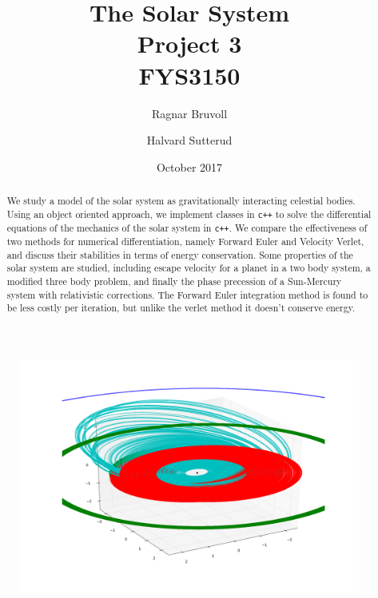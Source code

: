 \documentclass[10pt]{article}
\begin{document}
\title{The Solar System
\\ Project 3
\\ FYS3150}
\author{Ragnar Bruvoll \and Halvard Sutterud}
\date{October 2017}
\maketitle{\begin{center}\end{center}}
\thispagestyle{empty}

\begin{figure}[htpb]
    \centering
    \includegraphics[width=0.8\linewidth]{../results/front.png}
    \label{fig:name}
\end{figure}

\begin{abstract}
    We study a model of the solar system as gravitationally interacting
    celestial bodies.  Using an object oriented approach, we implement
    classes in \texttt{c++} to solve the differential equations of the
    mechanics of the solar system in \texttt{c++}. We compare the effectiveness of
    two methods for numerical differentiation, namely Forward Euler and
    Velocity Verlet, and discuss their stabilities in terms of energy
    conservation. Some properties of the solar system are studied, including
    escape velocity for a planet in a two body system, a modified three
    body problem, and finally the phase precession of a Sun-Mercury system
    with relativistic corrections. 
    The Forward Euler integration method is found to be less costly per
    iteration, but unlike the verlet method it doesn't conserve energy. 
     
\end{abstract}
\end{document}
